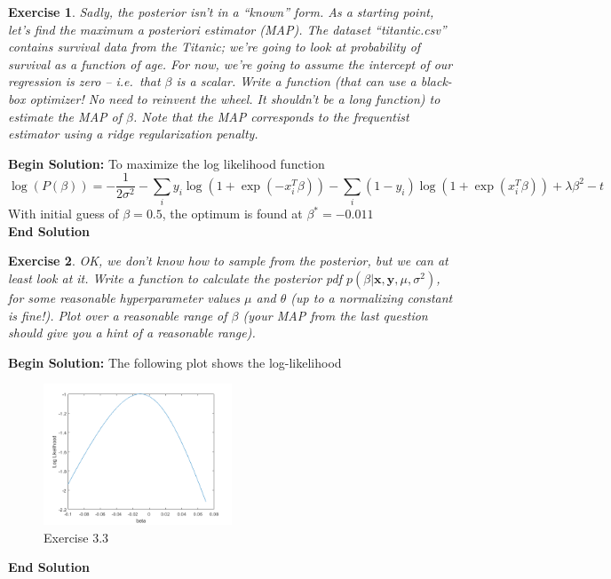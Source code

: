 \documentclass[twoside]{article}
\newcounter{lecnum}
\newtheorem{exercise}{Exercise}[lecnum]
\begin{document}
\begin{exercise}
  Sadly, the posterior isn't in a ``known'' form. As a starting point, let's find the maximum a posteriori estimator (MAP). The dataset ``titantic.csv'' contains survival data from the Titanic; we're going to look at probability of survival as a function of age. For now, we're going to assume the intercept of our regression is zero -- i.e.\ that $\beta$ is a scalar.  Write a function (that can use a black-box optimizer! No need to reinvent the wheel. It shouldn't be a long function) to estimate the MAP of $\beta$. Note that the MAP corresponds to the frequentist estimator using a ridge regularization penalty.
\end{exercise}

\textbf{Begin Solution:}
To maximize the log likelihood function
\begin{equation*}
\log \left(P\left(\beta \right) \right) = -\frac{1}{2\sigma^2} - \sum_{i} y_i \log \left(1 + \exp\left(-x_i^T \beta \right) \right) -\sum_i \left(1 - y_i \right)\log\left(1 + \exp\left(x_i^T \beta \right) \right) + \lambda\beta^2 - t
\end{equation*}
With initial guess of $\beta = 0.5$, the optimum is found at $\beta^* = -0.011$\\
\textbf{End Solution}

\begin{exercise}
  OK, we don't know how to sample from the posterior, but we can at least look at it. Write a function to calculate the posterior pdf $p(\beta|\mathbf{x},\mathbf{y},\mu,\sigma^2)$, for some reasonable hyperparameter values $\mu$ and $\theta$ (up to a normalizing constant is fine!). Plot over a reasonable range of $\beta$ (your MAP from the last question should give you a hint of a reasonable range).
\end{exercise}

\textbf{Begin Solution:}
The following plot shows the log-likelihood
\begin{figure}[H]
\begin{center}
\includegraphics[width=0.5\textwidth]{./figure32.png}
\end{center}
\caption{Exercise 3.3}
\end{figure}
\textbf{End Solution}
\end{document}

